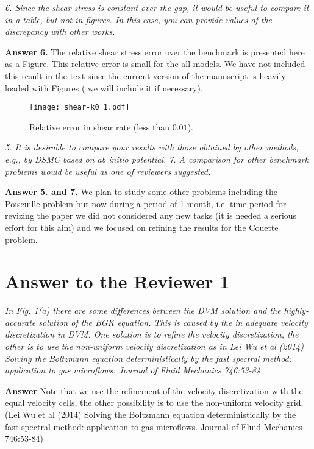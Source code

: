 \documentclass{article}
\begin{document}
{ \it 6. Since the shear stress is constant over the gap, it would be useful to compare it in a table, but not in figures. In this case, you can provide values of the discrepancy with other works.
}

{\bf Answer 6. } The  relative  shear stress  error over the benchmark is  presented here as a Figure. This relative error  is small for the all models.
We have  not included  this result in the  text since  the current version of the manuscript is  heavily loaded with Figures ( we  will include it if  necessary).  

\begin{figure}
    \centering
    \texttt{[image: shear-k0\_1.pdf]}
    \caption{
        Relative error  in shear rate (less  than $0.01$).
    }\label{fig:shear}
\end{figure}


{\it 5. It is desirable to compare your results with those obtained by other methods, e.g., by DSMC based on ab initio potential.
}
{\it 7. A comparison for other benchmark problems would be useful as one of reviewers suggested.
}

{\bf Answer 5. and  7. }We plan to study some other problems including the Poiseuille problem but now during a period of  1 month, i.e. 
time period for revizing the paper we did not considered any new tasks (it is needed a serious effort for this aim) 
and we focused on refining the results for the Couette problem.


\section*{ Answer to the Reviewer 1}

{\it
In Fig. 1(a) there are some differences between the DVM solution and the highly-accurate solution of the BGK equation. This is caused by the in adequate velocity discretization in DVM. One solution is to refine the velocity discretization, the other is to use the non-uniform velocity discretization as in Lei Wu et al (2014) Solving the Boltzmann equation deterministically by the fast spectral method: application to gas microflows. Journal of Fluid Mechanics 746:53-84.}

{\bf Answer} Note that we use the refinement of the velocity discretization with the equal velocity cells,
the other possibility is to use the non-uniform velocity grid, 
(Lei Wu et al (2014) Solving the Boltzmann equation deterministically by the fast spectral method: application to gas microflows. Journal of Fluid Mechanics 746:53-84)
\end{document}

